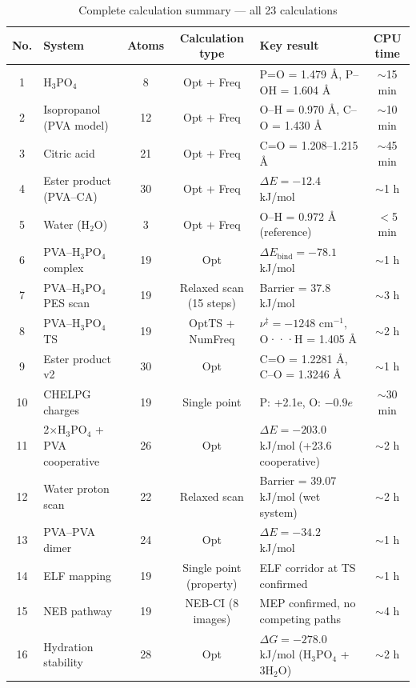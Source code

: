 \documentclass[12pt,a4paper]{report}
\begin{document}
\begin{table}[h!]
\centering
\footnotesize   %
\setlength{\tabcolsep}{3pt}  %
\caption{Complete calculation summary — all 23 calculations}
\label{tab:calc-summary}
\begin{tabular}{c l c c l c}
\toprule
No. & System & Atoms & Calculation type & Key result & CPU time \\
\midrule
1 & H\(_3\)PO\(_4\) & 8 & Opt + Freq & P=O = 1.479 Å, P–OH = 1.604 Å & \(\sim\)15 min \\
2 & Isopropanol (PVA model) & 12 & Opt + Freq & O–H = 0.970 Å, C–O = 1.430 Å & \(\sim\)10 min \\
3 & Citric acid & 21 & Opt + Freq & C=O = 1.208–1.215 Å & \(\sim\)45 min \\
4 & Ester product (PVA–CA) & 30 & Opt + Freq & \(\Delta E = -12.4\) kJ/mol & \(\sim\)1 h \\
5 & Water (H\(_2\)O) & 3 & Opt + Freq & O–H = 0.972 Å (reference) & \(<\)5 min \\
6 & PVA–H\(_3\)PO\(_4\) complex & 19 & Opt & \(\Delta E_{\text{bind}} = -78.1\) kJ/mol & \(\sim\)1 h \\
7 & PVA–H\(_3\)PO\(_4\) PES scan & 19 & Relaxed scan (15 steps) & Barrier = 37.8 kJ/mol & \(\sim\)3 h \\
8 & PVA–H\(_3\)PO\(_4\) TS & 19 & OptTS + NumFreq & \(\nu^{\ddagger} = -1248\) cm\(^{-1}\), O···H = 1.405 Å & \(\sim\)2 h \\
9 & Ester product v2 & 30 & Opt & C=O = 1.2281 Å, C–O = 1.3246 Å & \(\sim\)1 h \\
10 & CHELPG charges & 19 & Single point & P: +2.1e, O: \(-0.9e\) & \(\sim\)30 min \\
11 & 2\(\times\)H\(_3\)PO\(_4\) + PVA cooperative & 26 & Opt & \(\Delta E = -203.0\) kJ/mol (+23.6 cooperative) & \(\sim\)2 h \\
12 & Water proton scan & 22 & Relaxed scan & Barrier = 39.07 kJ/mol (wet system) & \(\sim\)2 h \\
13 & PVA–PVA dimer & 24 & Opt & \(\Delta E = -34.2\) kJ/mol & \(\sim\)1 h \\
14 & ELF mapping & 19 & Single point (property) & ELF corridor at TS confirmed & \(\sim\)1 h \\
15 & NEB pathway & 19 & NEB-CI (8 images) & MEP confirmed, no competing paths & \(\sim\)4 h \\
16 & Hydration stability & 28 & Opt & \(\Delta G = -278.0\) kJ/mol (H\(_3\)PO\(_4\) + 3H\(_2\)O) & \(\sim\)2 h \\

\end{tabular}
\end{table}
\end{document}
